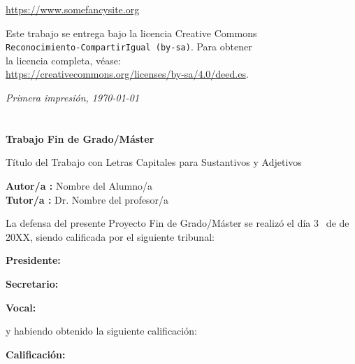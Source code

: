 \documentclass[
paper=a4,
fontsize=12pt,
twoside,
openright,                  %
titlepage,                  %
headsepline,                %
footheight=16pt,            %
parskip=half+,				%
numbers=noenddot,			%
headinclude=true,           %
footinclude=true,           %
cleardoublepage=empty,      %
captions=tableheading,      %
BCOR=12mm, 				    %
DIV=12   			        %
usegeometry=true			%
]{scrbook}
\begin{document}
    {\url{https://www.somefancysite.org}
    \medskip
    
    \par\noindent  Este trabajo se entrega bajo la licencia Creative Commons\\
    \texttt{Reconocimiento-CompartirIgual (by-sa)}. Para obtener\\
    la licencia completa, véase:\\
    \url{https://creativecommons.org/licenses/by-sa/4.0/deed.es}.
    \bigskip
    
    \par\noindent \textit{Primera impresión, \today}
\thispagestyle{empty}
    

\clearpage
{}
\chapter*{}

\vspace{-4cm}
\begin{center}
\LARGE
\textbf{Trabajo Fin de Grado/Máster}

\vspace{1cm}
\large
Título del Trabajo con Letras Capitales para Sustantivos y Adjetivos

\vspace{1cm}
\large
\textbf{Autor/a :} Nombre del Alumno/a  \\
\textbf{Tutor/a :} Dr. Nombre del profesor/a

\end{center}

\vspace{1cm}
La defensa del presente Proyecto Fin de Grado/Máster se realizó el día 3\qquad$\;\,$ de
\qquad\qquad\qquad\qquad \newline de 20XX, siendo calificada por el siguiente tribunal:


\vspace{0.5cm}
\textbf{Presidente:}

\vspace{0.8cm}
\textbf{Secretario:}

\vspace{0.8cm}
\textbf{Vocal:}


\vspace{0.8cm}
y habiendo obtenido la siguiente calificación:

\vspace{0.8cm}
\textbf{Calificación:}


}
\end{document}
